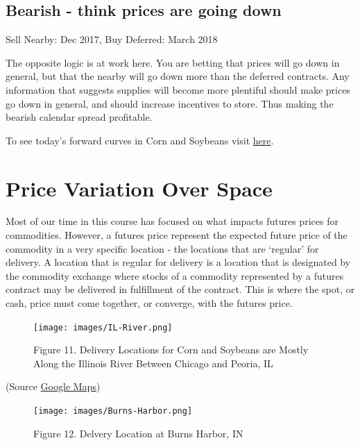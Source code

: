 \documentclass[
  letterpaper,
  DIV=11,
  numbers=noendperiod]{scrreprt}
\begin{document}
\hypertarget{bearish---think-prices-are-going-down}{%
\subsection{Bearish - think prices are going
down}\label{bearish---think-prices-are-going-down}}

Sell Nearby: Dec 2017, Buy Deferred: March 2018

The opposite logic is at work here. You are betting that prices will go
down in general, but that the nearby will go down more than the deferred
contracts. Any information that suggests supplies will become more
plentiful should make prices go down in general, and should increase
incentives to store. Thus making the bearish calendar spread profitable.

To see today's forward curves in Corn and Soybeans visit
\href{https://mindymallory.shinyapps.io/ForwardCurves/}{here}.

\hypertarget{price-variation-over-space}{%
\section{Price Variation Over Space}\label{price-variation-over-space}}

Most of our time in this course has focused on what impacts futures
prices for commodities. However, a futures price represent the expected
future price of the commodity in a very specific location - the
locations that are `regular' for delivery. A location that is regular
for delivery is a location that is designated by the commodity exchange
where stocks of a commodity represented by a futures contract may be
delivered in fulfillment of the contract. This is where the spot, or
cash, price must come together, or converge, with the futures price.

\begin{figure}

{\centering \texttt{[image: images/IL-River.png]}

}

\caption{Figure 11. Delivery Locations for Corn and Soybeans are Mostly
Along the Illinois River Between Chicago and Peoria, IL}

\end{figure}

(Source \href{https://www.google.com/maps}{Google Maps})

\begin{figure}

{\centering \texttt{[image: images/Burns-Harbor.png]}

}

\caption{Figure 12. Delvery Location at Burns Harbor, IN}

\end{figure}
\end{document}
